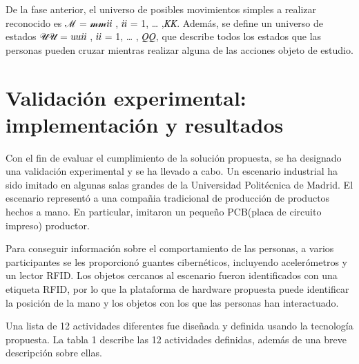 \documentclass{article}
\begin{document}
De la fase anterior, el universo de posibles movimientos simples a realizar
reconocido es ℳ = {𝓂𝓂𝑖𝑖 , 𝑖𝑖 = 1, … ,𝐾𝐾}. Además, se define un universo de estados
𝒰𝒰 = {𝑢𝑢𝑖𝑖 , 𝑖𝑖 = 1, … , 𝑄𝑄}, que describe todos los estados que las personas pueden cruzar mientras
realizar alguna de las acciones objeto de estudio.


\section {Validación experimental: implementación y resultados}
Con el fin de evaluar el cumplimiento de la solución propuesta, se ha designado una validación experimental y se ha llevado a cabo. Un escenario industrial ha sido imitado en algunas salas grandes de la Universidad Politécnica de Madrid. El escenario representó a una compañia tradicional de producción de productos hechos a mano. En particular, imitaron un pequeño PCB(placa de circuito impreso) productor.

Para conseguir información sobre el comportamiento de las personas, a varios participantes se les proporcionó guantes cibernéticos, incluyendo acelerómetros y un lector RFID. Los objetos cercanos al escenario fueron identificados con una etiqueta RFID, por lo que la plataforma de hardware propuesta puede identificar la posición de la mano y los objetos con los que las personas han interactuado.

Una lista de 12 actividades diferentes fue diseñada y definida usando la tecnología propuesta. La tabla 1 describe las 12 actividades definidas, además de una breve descripción sobre ellas. \newline
\end{document}
